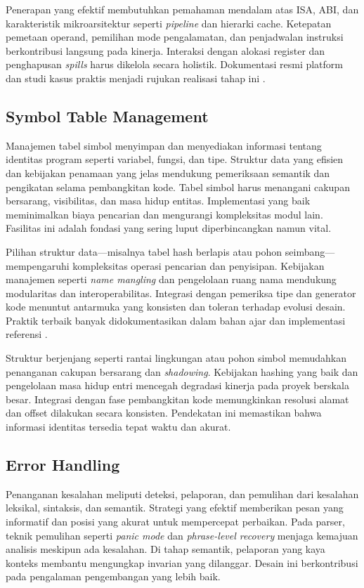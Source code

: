 \documentclass[../main.tex]{subfiles}
\begin{document}
Penerapan yang efektif membutuhkan pemahaman mendalam atas ISA, ABI, dan karakteristik mikroarsitektur seperti \emph{pipeline} dan hierarki cache. Ketepatan pemetaan operand, pemilihan mode pengalamatan, dan penjadwalan instruksi berkontribusi langsung pada kinerja. Interaksi dengan alokasi register dan penghapusan \emph{spills} harus dikelola secara holistik. Dokumentasi resmi platform dan studi kasus praktis menjadi rujukan realisasi tahap ini \citep{WikiInstructionSelection,WikiRegisterAllocation}.

\subsection{Symbol Table Management}
Manajemen tabel simbol menyimpan dan menyediakan informasi tentang identitas program seperti variabel, fungsi, dan tipe. Struktur data yang efisien dan kebijakan penamaan yang jelas mendukung pemeriksaan semantik dan pengikatan selama pembangkitan kode. Tabel simbol harus menangani cakupan bersarang, visibilitas, dan masa hidup entitas. Implementasi yang baik meminimalkan biaya pencarian dan mengurangi kompleksitas modul lain. Fasilitas ini adalah fondasi yang sering luput diperbincangkan namun vital.

Pilihan struktur data—misalnya tabel hash berlapis atau pohon seimbang—mempengaruhi kompleksitas operasi pencarian dan penyisipan. Kebijakan manajemen seperti \emph{name mangling} dan pengelolaan ruang nama mendukung modularitas dan interoperabilitas. Integrasi dengan pemeriksa tipe dan generator kode menuntut antarmuka yang konsisten dan toleran terhadap evolusi desain. Praktik terbaik banyak didokumentasikan dalam bahan ajar dan implementasi referensi \citep{CS143}.

Struktur berjenjang seperti rantai lingkungan atau pohon simbol memudahkan penanganan cakupan bersarang dan \emph{shadowing}. Kebijakan hashing yang baik dan pengelolaan masa hidup entri mencegah degradasi kinerja pada proyek berskala besar. Integrasi dengan fase pembangkitan kode memungkinkan resolusi alamat dan offset dilakukan secara konsisten. Pendekatan ini memastikan bahwa informasi identitas tersedia tepat waktu dan akurat.

\subsection{Error Handling}
Penanganan kesalahan meliputi deteksi, pelaporan, dan pemulihan dari kesalahan leksikal, sintaksis, dan semantik. Strategi yang efektif memberikan pesan yang informatif dan posisi yang akurat untuk mempercepat perbaikan. Pada parser, teknik pemulihan seperti \emph{panic mode} dan \emph{phrase-level recovery} menjaga kemajuan analisis meskipun ada kesalahan. Di tahap semantik, pelaporan yang kaya konteks membantu mengungkap invarian yang dilanggar. Desain ini berkontribusi pada pengalaman pengembangan yang lebih baik.
\end{document}
